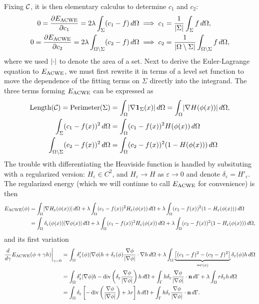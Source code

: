 Fixing $\mathcal{C}$, it is then elementary calculus to determine $c_1$ and $c_2$: 
\begin{align*}
0 = \frac{\partial E_\textrm{ACWE}}{\partial c_1}  = 2\lambda \int_{\Sigma} (c_1 - f ) \,d\Omega
&\implies 
c_1 = \frac{1}{\lvert\Sigma\rvert} \int_{\Sigma} f \,d\Omega,
\\
0 = \frac{\partial E_\textrm{ACWE}}{\partial c_2}  = 2\lambda \int_{\Omega\setminus \Sigma} (c_2 - f )\,d\Omega
&\implies 
c_2 = \frac{1}{\lvert\Omega\setminus\Sigma\rvert} \int_{\Omega\setminus \Sigma} f \,d\Omega,
\end{align*}
where we used $\lvert\cdot\rvert$ to denote the area of a set. Next to derive the Euler-Lagrange equation to $E_\textrm{ACWE}$, we must first rewrite it in terms of a level set function to move the dependence of the fitting terms on $\Sigma$ directly into the integrand. The three terms forming $E_\textrm{ACWE}$ can be expressed as 
\begin{align}
\textrm{Length}(\mathcal{C}) 
= \textrm{Perimeter}(\Sigma) 
&= \int_{\Omega} \lvert\nabla \mathbf{1}_\Sigma(x)\rvert \,d\Omega
= \int_{\Omega} \lvert \nabla H(\phi(x)) \rvert \,d\Omega,
\label{eacwe1}
\\
\int_{\Sigma} (c_1 - f(x) )^2 \, d\Omega 
&= \int_{\Omega} (c_1 - f(x))^2 H(\phi(x)) \, d\Omega
\\
\int_{\Omega\setminus\Sigma} (c_2 - f(x))^2 \,d\Omega 
&=
\int_{\Omega} (c_2 - f(x))^2 (1 - H(\phi(x))) \,d\Omega
\end{align}
The trouble with differentiating the Heaviside function is handled by subsituting with a regularized version: $H_\varepsilon \in C^2$, and $H_\varepsilon \rightarrow H$ as $\varepsilon\rightarrow 0$ and denote $\delta_\varepsilon = H'_\varepsilon$. The regularized energy (which we will continue to call $E_\textrm{ACWE}$ for convenience) is then 
\begin{align*}
E_\textrm{ACWE}(\phi) 
&= \int_{\Omega } \lvert\nabla H_\varepsilon(\phi(x))\rvert \,d\Omega 
+ \lambda\int_{\Omega} (c_1 - f(x))^2 H_\varepsilon(\phi(x)) \, d\Omega 
+ \lambda\int_{\Omega} (c_2 - f(x))^2 (1 - H_\varepsilon(\phi(x))) \,d\Omega
\\
&= \int_{\Omega } \delta_\varepsilon(\phi(x)) \lvert\nabla \phi(x)\rvert \,d\Omega 
+ \lambda\int_{\Omega} (c_1 - f(x))^2 H_\varepsilon(\phi(x)) \, d\Omega 
+ \lambda\int_{\Omega} (c_2 - f(x))^2 (1 - H_\varepsilon(\phi(x))) \,d\Omega,
\end{align*}
and its first variation
\begin{align*}
\frac{d}{d\gamma}E_\textrm{ACWE}(\phi + \gamma h) \bigg\rvert_{\gamma = 0}
&= \int_{\Omega} \delta'_\varepsilon(\phi) \lvert\nabla \phi\rvert h + \delta_\varepsilon(\phi) \frac{\nabla \phi}{\lvert\nabla \phi\rvert} \cdot \nabla h \,d\Omega
+ \lambda\int_{\Omega} \underbrace{\left[(c_1 - f)^2 - (c_2 - f)^2 \right]}_{=r(x)} \delta_\varepsilon(\phi) h \,d\Omega 
\\
&= \int_{\Omega } \delta'_\varepsilon \lvert\nabla \phi\rvert h
- \operatorname{div}\left(\delta_\varepsilon\frac{\nabla \phi}{\lvert\nabla \phi\rvert}  \right)  h
\,d\Omega 
+ \int_\Gamma h\delta_\varepsilon\frac{\nabla \phi}{\lvert\nabla \phi\rvert} \cdot \mathbf{n} \,d\Gamma 
+ \lambda\int_{\Omega} r \delta_\varepsilon h \,d\Omega
\\
&= \int_{\Omega} \delta_\varepsilon\left[ 
- \operatorname{div}\left(\frac{\nabla \phi}{\lvert\nabla \phi\rvert} \right) + \lambda r
\right] h\,d\Omega 
+ \int_\Gamma h\delta_\varepsilon\frac{\nabla \phi}{\lvert\nabla \phi\rvert} \cdot \mathbf{n} \,d\Gamma. 
\end{align*}
